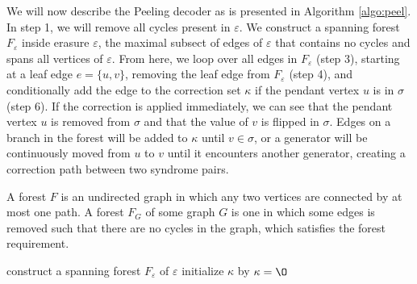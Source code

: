 



We will now describe the Peeling decoder as is presented in Algorithm \ref{algo:peel}. In step 1, we will remove all cycles present in $\varepsilon$. We construct a spanning forest $F_\varepsilon$ inside erasure $\varepsilon$, the maximal subsect of edges of $\varepsilon$ that contains no cycles and spans all vertices of $\varepsilon$. From here, we loop over all edges in $F_\varepsilon$ (step 3), starting at a leaf edge $e = \{u,v\}$, removing the leaf edge from $F_\varepsilon$ (step 4), and conditionally add the edge to the correction set $\kappa$ if the pendant vertex $u$ is in $\sigma$ (step 6). If the correction is applied immediately, we can see that the pendant vertex $u$ is removed from $\sigma$ and that the value of $v$ is flipped in $\sigma$. Edges on a branch in the forest will be added to $\kappa$ until $v \in \sigma$, or a generator will be continuously moved from $u$ to $v$ until it encounters another generator, creating a correction path between two syndrome pairs.

\begin{lemma}\label{lem:forestofgraph}
  A forest $F$ is an undirected graph in which any two vertices are connected by at most one path. A forest $F_G$ of some graph $G$ is one in which some edges is removed such that there are no cycles in the graph, which satisfies the forest requirement.
\end{lemma}

\begin{algo}[algotitle=Peeling decoder \cite{delfosse2017linear}, label=algo:peel]
\begin{algorithm}[H]
    \BlankLine
    construct a spanning forest $F_\varepsilon$ of $\varepsilon$\;
    initialize $\kappa$ by $\kappa = {\O}$\;
    \KwRet{$\kappa$}
\end{algorithm}
\end{algo}

